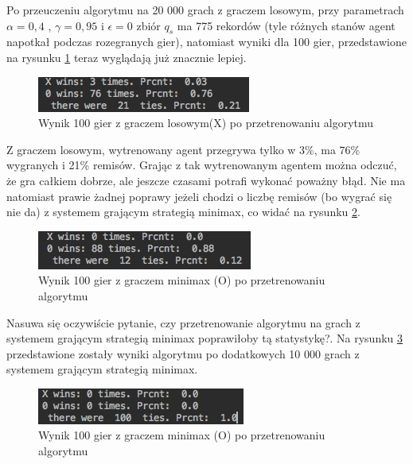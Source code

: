 \documentclass[licencjacka]{pracamgr}
\begin{document}
Po przeuczeniu algorytmu na 20 000 grach z graczem losowym, przy parametrach $\alpha=0,4$ , $\gamma=0,95$ i $\epsilon=0$ zbiór $q_{s}$ ma 775 rekordów (tyle różnych stanów  agent napotkał podczas rozegranych gier), natomiast wyniki dla 100 gier, przedstawione na rysunku \ref{Rys16} teraz wyglądają już znacznie lepiej.\\

\begin{figure}[h!]
	\includegraphics [scale=0.8]{Qtable_vs_Rnd_trained.png}
	\caption{Wynik 100 gier z graczem losowym(X) po przetrenowaniu algorytmu}
	\label{Rys16}
\end{figure}


Z graczem losowym, wytrenowany agent przegrywa tylko w 3\%, ma 76\% wygranych i 21\% remisów. Grając z tak wytrenowanym agentem można odczuć, że gra całkiem dobrze, ale jeszcze czasami potrafi wykonać poważny błąd. Nie ma natomiast prawie żadnej poprawy jeżeli chodzi o liczbę remisów (bo wygrać się nie da) z systemem grającym strategią minimax, co widać na rysunku \ref{Rys17}. \\

\begin{figure}[h!]
	\includegraphics [scale=0.8]{QTable_vs_Minimax_trained.png}
	\caption{Wynik 100 gier z graczem minimax (O) po przetrenowaniu algorytmu}
	\label{Rys17}
\end{figure}

Nasuwa się oczywiście pytanie, czy przetrenowanie algorytmu na grach z systemem grającym strategią minimax poprawiłoby tą statystykę?. Na rysunku \ref{Rys18} przedstawione zostały wyniki algorytmu po dodatkowych 10 000 grach z systemem grającym strategią minimax.\\

\begin{figure}[h!]
	\includegraphics [scale=0.8]{QTable_vs_Minimax_trained_d.png}
	\caption{Wynik 100 gier z graczem minimax (O) po przetrenowaniu algorytmu}
	\label{Rys18}
\end{figure}
\end{document}
